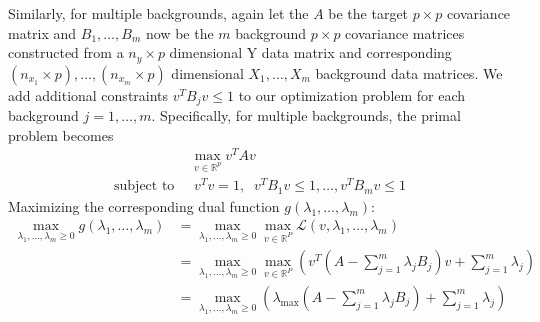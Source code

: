 \documentclass[12pt]{article}
\begin{document}
Similarly, for multiple backgrounds, again let the $A$ be the target $p \times p$ covariance matrix and $ B_1, \ldots, B_m$ now be the $m$ background $p \times p$ covariance matrices constructed from a $n_y \times p$ dimensional Y data matrix and corresponding $(n_{x_1} \times p), \ldots, (n_{x_m}\times p)$ dimensional $X_1, \ldots, X_m$ background data matrices.
We add additional constraints $ v^TB_jv\leq 1$ to our optimization problem for each background $j = 1, \ldots, m$. Specifically, for multiple backgrounds, the primal problem becomes
\begin{align}
  &\max_{v\in \mathbb{R}^p}{v^TAv} \label{eq:4}\\ 
  \text{subject to }&\; v^{T}v=1,\;\; v^TB_1 v \leq 1, \ldots, v^T B_m v\leq 1 \nonumber
\end{align}
Maximizing the corresponding dual function $g(\lambda_1, \ldots, \lambda_m)$:
\begin{align}
    \max_{\lambda_1,\ldots,\lambda_m \geq 0}{g(\lambda_1, \ldots, \lambda_m)} &= \max_{\lambda_1,\ldots,\lambda_m \geq 0}{\max_{v\in \mathbb{R}^{P}}{\mathcal{L}\left(v, \lambda_1, \ldots, \lambda_m\right)}} \nonumber \\
                                                                                                                                &=\max_{\lambda_1,\ldots,\lambda_m \geq 0}{\max_{v\in \mathbb{R}^{P}}{\left(v^T\left(A - \sum^{m}_{j = 1}{\lambda_j B_j}\right)v + \sum^{m}_{j=1}{\lambda_j}\right)}} \nonumber\\
                                                                                                                                &=\max_{\lambda_1,\ldots,\lambda_m \geq 0}{\left(\lambda_{\text{max}}\left(A - \sum^{m}_{j = 1}{\lambda_j B_j}\right) + \sum^{m}_{j=1}{\lambda_j}\right)} \label{eq:5}
\end{align}
\end{document}
